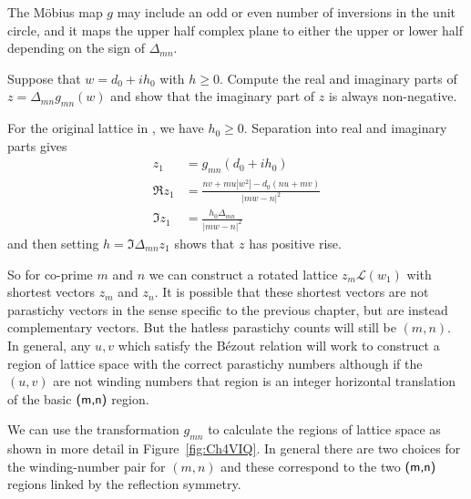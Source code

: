The M\"obius map $g$ may include an odd or even number of inversions in the unit circle, and it maps the upper half complex plane to either the upper or lower half depending on the sign of $\Delta_{mn}$. 

\begin{jExercise}
	\label{ex:signz}
	Suppose that $w=d_0+ih_0$ with $h\geq 0$. Compute the real and imaginary parts of $z = \Delta_{mn}g_{mn}(w)$ and show that the imaginary part of $z$ is always non-negative.
\end{jExercise}

\begin{jAnswer}
For the original lattice in , we have $h_0\geq0$. Separation into real and imaginary parts  gives
	\begin{align}
		z_1 &= g_{mn}(d_0+ih_0) 
		\\
		\Re z_1 &= 
		\frac{n v + m u| w^2|	- d_0( n u + m v)}{|m w-n|^2} 
			\\
			\Im z_1 &=
	\frac{	 h_0 \Delta_{mn}}{|m w-n|^2}
	\label{eq:gReImA}
\end{align}
and then setting $h=\Im \Delta_{mn}z_1$ shows that $z$ has positive rise.
\end{jAnswer}

 So for co-prime $m$ and $n$ we can construct a rotated lattice $z_m \mathcal{L}(w_1)$  with shortest vectors $z_m$ and $z_n$. It is possible that these shortest vectors are not parastichy vectors in the sense specific to the previous chapter, but are instead complementary vectors. But the hatless parastichy counts will still be $(m,n)$. In general, any $u,v$ which satisfy the B\'ezout relation will work to construct a region of lattice space with the correct parastichy numbers although if the $(u,v)$ are not winding numbers that region is an integer horizontal translation of the basic $\textsf{(m,n)}$ region.
 	


We can use the transformation $g_{mn}$ to calculate the regions of
lattice space as shown in more detail in Figure~\ref{fig:Ch4VIQ}.
In general there are two choices for the winding-number pair for $(m,n)$ and these correspond to the two $\textsf{(m,n)}$ regions linked by the reflection symmetry.



